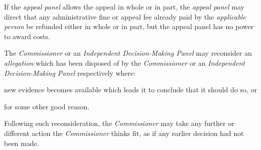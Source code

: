 If the \emph{appeal panel} allows the appeal in whole or in part,
the \emph{appeal panel} may direct that any administrative fine or
appeal fee already paid by the \emph{applicable person} be refunded
either in whole or in part, but the appeal panel has no power to award
costs.\\
\par
{}
The \emph{Commissioner} or an \emph{Independent Decision-Making
Panel} may reconsider an \emph{allegation} which has been disposed of by
the \emph{Commissioner} or an \emph{Independent Decision-Making
Panel} respectively where:\\\nl \item new evidence becomes available which leads it to conclude that it
should do so, or\item for some other good reason.\ln
{}\par
Following such reconsideration, the \emph{Commissioner} may take any
further or different action the \emph{Commissioner} thinks fit, as if
any earlier decision had not been made.\\
\par
{}

